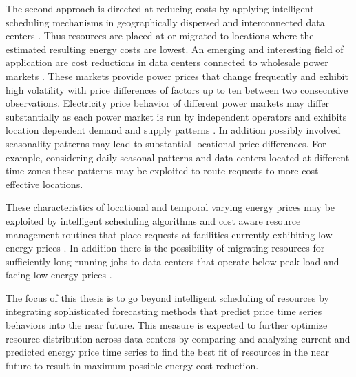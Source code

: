 The second approach is directed at reducing costs by applying intelligent scheduling mechanisms in geographically dispersed and interconnected data centers \cite{guler2013cutting, qureshi2009cutting}. Thus resources are placed at or migrated to locations where the estimated resulting energy costs are lowest. 
An emerging and interesting field of application are cost reductions in data centers connected to wholesale power markets \cite{rao2010minimizing}. These markets provide power prices that change frequently and exhibit high volatility with price differences of factors up to ten between two consecutive observations. 
Electricity price behavior of different power markets may differ substantially as each power market is run by independent operators and exhibits location dependent demand and supply patterns \cite{mugele2005stable}. In addition possibly involved seasonality patterns may lead to substantial locational price differences. For example, considering daily seasonal patterns and data centers located at different time zones these patterns may be exploited to route requests to more cost effective locations. 

These characteristics of locational and temporal varying energy prices may be exploited by intelligent scheduling algorithms and cost aware resource management routines that place requests at facilities currently exhibiting low energy prices \cite{rao2010minimizing}. In addition there is the possibility of migrating resources for sufficiently long running jobs to data centers that operate below peak load and facing low energy prices \cite{buchbinder2011online}.

The focus of this thesis is to go beyond intelligent scheduling of resources by integrating sophisticated forecasting methods that predict price time series behaviors into the near future. This measure is expected to further optimize resource distribution across data centers by comparing and analyzing current and predicted energy price time series to find the best fit of resources in the near future to result in maximum possible energy cost reduction.



